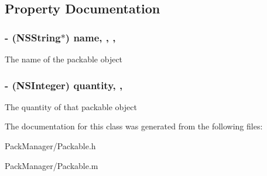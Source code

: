 \subsection{Property Documentation}
\hypertarget{interface_packable_ac796b857c15e96bfe0cab64d4f855b8d}{
\subsubsection[{name}]{\setlength{\rightskip}{0pt plus 5cm}-\/ (N\-S\-String$\ast$) name\hspace{0.3cm}{\ttfamily [read]}, {\ttfamily [write]}, {\ttfamily [nonatomic]}, {\ttfamily [strong]}}}\label{interface_packable_ac796b857c15e96bfe0cab64d4f855b8d}
The name of the packable object \hypertarget{interface_packable_a1bcccd6d856e10d677a6ba2c86f87768}{
\subsubsection[{quantity}]{\setlength{\rightskip}{0pt plus 5cm}-\/ (N\-S\-Integer) quantity\hspace{0.3cm}{\ttfamily [read]}, {\ttfamily [write]}, {\ttfamily [atomic]}}}\label{interface_packable_a1bcccd6d856e10d677a6ba2c86f87768}
The quantity of that packable object 

The documentation for this class was generated from the following files\-:\begin{DoxyCompactItemize}
\item 
Pack\-Manager/Packable.\-h\item 
Pack\-Manager/Packable.\-m\end{DoxyCompactItemize}
